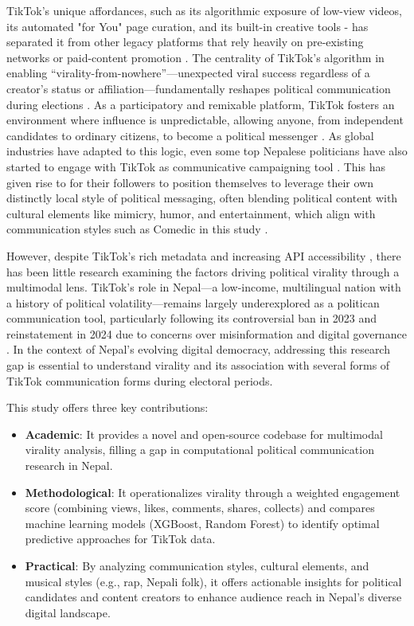 \documentclass[12pt,a4paper]{report}
\begin{document}
TikTok's unique affordances, such as its algorithmic exposure of low-view videos, its automated "for You" page curation, and its built-in creative tools - has separated it from other legacy platforms that rely heavily on pre-existing networks or paid-content promotion \parencite{guinaudeau2022fifteen}. The centrality of TikTok’s algorithm in enabling ``virality-from-nowhere''—unexpected viral success regardless of a creator’s status or affiliation—fundamentally reshapes political communication during elections \parencite{guinaudeau2022fifteen}. As a participatory and remixable platform, TikTok fosters an environment where influence is unpredictable, allowing anyone, from independent candidates to ordinary citizens, to become a political messenger \parencite{guinaudeau2022fifteen}. As global industries have adapted to this logic, even some top Nepalese politicians have also started to engage with TikTok as communicative campaigning tool \parencite{himalayantimes2025oli}. This has given rise to for their followers to position themselves to leverage their own distinctly local style of political messaging, often blending political content with cultural elements like mimicry, humor, and entertainment, which align with communication styles such as Comedic in this study \parencite{umansky2023dances}. 

However, despite TikTok’s rich metadata and increasing API accessibility \parencite{tiktokResearchAPI2025}, there has been little research examining the factors driving political virality through a multimodal lens. TikTok’s role in Nepal—a low-income, multilingual nation with a history of political volatility—remains largely underexplored as a politican communication tool, particularly following its controversial ban in 2023 and reinstatement in 2024 due to concerns over misinformation and digital governance \parencite{lamichhane2024tik, reuters2024tiktok}. In the context of Nepal’s evolving digital democracy, addressing this research gap is essential to understand virality and its association with several forms of TikTok communication forms   during electoral periods. 

This study offers three key contributions:
\begin{itemize}
    \item \textbf{Academic}: It provides a novel and open-source codebase for multimodal virality analysis, filling a gap in computational political communication research in Nepal.
    \item \textbf{Methodological}: It operationalizes virality through a weighted engagement score (combining views, likes, comments, shares, collects) and compares machine learning models (XGBoost, Random Forest) to identify optimal predictive approaches for TikTok data.
    \item \textbf{Practical}: By analyzing communication styles, cultural elements, and musical styles (e.g., rap, Nepali folk), it offers actionable insights for political candidates and content creators to enhance audience reach in Nepal’s diverse digital landscape.
\end{itemize}
\end{document}
